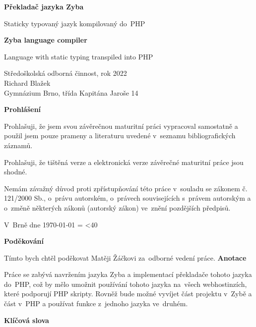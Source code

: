 \documentclass[a4paper,12pt]{article}
\author{Richard Blažek}
\makeatletter
\newcommand{\repeatchar}[2]{
  \begingroup
  \my@repeat@count=\z@
  \@whilenum\my@repeat@count<#1\do{#2\advance\my@repeat@count\@ne}
  \endgroup
}
\makeatother
\begin{document}
\begin{titlepage}
    \begin{center}

  \vspace*{3.5cm}            
  \Huge
  \textbf{Překladač jazyka Zyba}
            
  \vspace{0.5cm}
  \LARGE
  Staticky typovaný jazyk kompilovaný do~PHP
        
  \vspace*{1.5cm}
  \Huge
  \textbf{Zyba language compiler}
            
  \vspace{0.5cm}
  \LARGE
  Language with static typing transpiled into PHP
            
  \vfill
            
  \large
        Středoškolská odborná činnost, rok 2022\\
  Richard Blažek\\
  Gymnázium Brno, třída Kapitána Jaroše 14
    \end{center}
\end{titlepage}
\thispagestyle{empty}
\Large\textbf{Prohlášení}\normalsize

Prohlašuji, že jsem svou závěrečnou maturitní práci vypracoval samostatně a použil jsem pouze prameny a literaturu uvedené v~seznamu bibliografických záznamů.

Prohlašuji, že tištěná verze a elektronická verze závěrečné maturitní práce jsou shodné.

Nemám závažný důvod proti zpřístupňování této práce v~souladu se zákonem č. 121/2000 Sb., o~právu autorském, o~právech souvisejících s~právem autorským a o~změně některých zákonů (autorský zákon) ve~znění pozdějších předpisů. 

V~Brně dne \today{} \repeatchar{40}{.}
\newpage
\thispagestyle{empty}
\Large\textbf{Poděkování}\normalsize

Tímto bych chtěl poděkovat Matěji Žáčkovi za~odborné vedení práce.
\newpage
\thispagestyle{empty}
\Large\textbf{Anotace}\normalsize

Práce se zabývá navržením jazyka Zyba a implementací překladače tohoto jazyka do~PHP, což by mělo umožnit používání tohoto jazyka na~všech webhostinzích, které podporují PHP skripty. Rovněž bude možné vyvíjet část projektu v~Zybě a část v~PHP a používat funkce z~jednoho jazyka ve~druhém.

\Large\textbf{Klíčová slova}\normalsize
\end{document}
